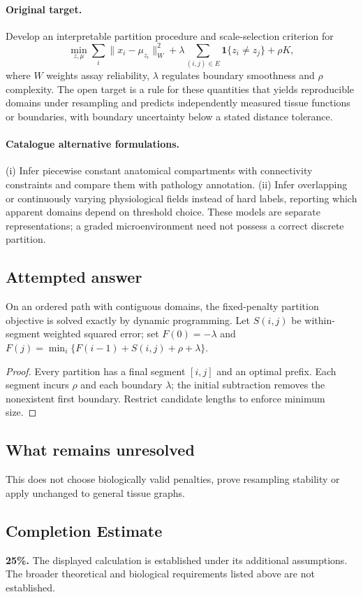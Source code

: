 \documentclass[11pt]{article}
\begin{document}
\paragraph{Original target.}
Develop an interpretable partition procedure and scale-selection criterion for
\[\min_{z,\mu}\sum_i\|x_i-\mu_{z_i}\|_{W}^2+\lambda\sum_{(i,j)\in E}\mathbf1\{z_i\ne z_j\}+\rho K,\]
where $W$ weights assay reliability, $\lambda$ regulates boundary smoothness and $\rho$ complexity. The open target is a rule for these quantities that yields reproducible domains under resampling and predicts independently measured tissue functions or boundaries, with boundary uncertainty below a stated distance tolerance.
\paragraph{Catalogue alternative formulations.}
(i) Infer piecewise constant anatomical compartments with connectivity constraints and compare them with pathology annotation. (ii) Infer overlapping or continuously varying physiological fields instead of hard labels, reporting which apparent domains depend on threshold choice. These models are separate representations; a graded microenvironment need not possess a correct discrete partition.
\subsection{Attempted answer}
\begin{proposition}
On an ordered path with contiguous domains, the fixed-penalty partition objective is solved exactly by dynamic programming. Let $S(i,j)$ be within-segment weighted squared error; set $F(0)=-\lambda$ and $F(j)=\min_i\{F(i-1)+S(i,j)+\rho+\lambda\}$.
\end{proposition}
\begin{proof}
Every partition has a final segment $[i,j]$ and an optimal prefix. Each segment incurs $\rho$ and each boundary $\lambda$; the initial subtraction removes the nonexistent first boundary. Restrict candidate lengths to enforce minimum size.
\end{proof}
\subsection{What remains unresolved}
This does not choose biologically valid penalties, prove resampling stability or apply unchanged to general tissue graphs.
\subsection{Completion Estimate}
\textbf{25\%.} The displayed calculation is established under its additional assumptions. The broader theoretical and biological requirements listed above are not established.
\end{document}
